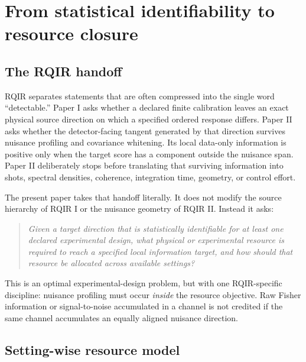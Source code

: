\section{From statistical identifiability to resource closure}
\label{sec:resource-map}

\subsection{The RQIR handoff}

RQIR separates statements that are often compressed into the single word ``detectable.'' Paper I asks whether a declared finite calibration leaves an exact physical source direction on which a specified ordered response differs. Paper II asks whether the detector-facing tangent generated by that direction survives nuisance profiling and covariance whitening. Its local data-only information is positive only when the target score has a component outside the nuisance span. Paper II deliberately stops before translating that surviving information into shots, spectral densities, coherence, integration time, geometry, or control effort.

The present paper takes that handoff literally. It does not modify the source hierarchy of RQIR I or the nuisance geometry of RQIR II. Instead it asks:
\begin{quote}
\emph{Given a target direction that is statistically identifiable for at least one declared experimental design, what physical or experimental resource is required to reach a specified local information target, and how should that resource be allocated across available settings?}
\end{quote}

This is an optimal experimental-design problem, but with one RQIR-specific discipline: nuisance profiling must occur \emph{inside} the resource objective. Raw Fisher information or signal-to-noise accumulated in a channel is not credited if the same channel accumulates an equally aligned nuisance direction.

\subsection{Setting-wise resource model}

